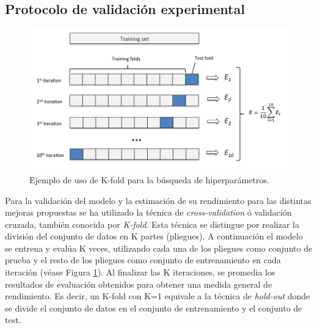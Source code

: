 %
%

\subsection{Protocolo de validación experimental} 
\label{sec:Validation}

\begin{figure}[htp]
 \begin{center}
   \includegraphics[width=\textwidth]{imagenes/chapter5/cross-validation}
 \end{center}
 \caption{Ejemplo de uso de K-fold para la búsqueda de hiperparámetros.}
 \label{fig:K-fold}
\end{figure}

Para la validación del modelo y la estimación de su rendimiento para las distintas 
mejoras propuestas se ha utilizado la técnica de \emph{cross-validation} ó 
validación cruzada, también conocida por \emph{K-fold}. 
Esta técnica se distingue por realizar la división del conjunto de datos 
en K partes (pliegues). A continuación el modelo se entrena y evalúa K veces, utilizando 
cada una de los pliegues como conjunto de prueba y el resto de los pliegues como 
conjunto de entrenamiento en cada iteración (véase Figura \ref{fig:K-fold}). 
Al finalizar las K iteraciones, se promedia los resultados de evaluación 
obtenidos para obtener una medida general de rendimiento. 
Es decir, un K-fold con K=1 equivale a la técnica de \emph{hold-out} 
donde se divide el conjunto de datos en el conjunto de entrenamiento y 
el conjunto de test.  

